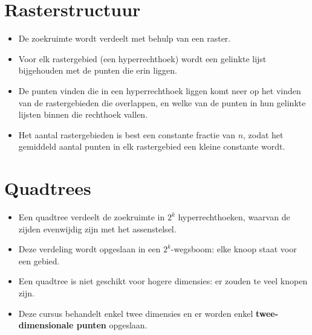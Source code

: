 \section{Rasterstructuur}
\begin{itemize}
    \item De zoekruimte wordt verdeelt met behulp van een raster.
    \item Voor elk rastergebied (een hyperrechthoek) wordt een gelinkte lijst bijgehouden met de punten die erin liggen.
    \item De punten vinden die in een hyperrechthoek liggen komt neer op het vinden van de rastergebieden die overlappen, en welke van de punten in hun gelinkte lijsten binnen die rechthoek vallen.
    \item Het aantal rastergebieden is best een constante fractie van $n$, zodat het gemiddeld aantal punten in elk rastergebied een kleine constante wordt.
\end{itemize}
\section{Quadtrees}
\begin{itemize}
    \item Een quadtree verdeelt de zoekruimte in $2^k$ hyperrechthoeken, waarvan de zijden evenwijdig zijn met het assenstelsel.
    \item Deze verdeling wordt opgeslaan in een $2^k$-wegsboom: elke knoop staat voor een gebied.
    \item Een quadtree is niet geschikt voor hogere dimensies: er zouden te veel knopen zijn.
    \item Deze cursus behandelt enkel twee dimensies en er worden enkel \textbf{twee-dimensionale punten} opgeslaan.
\end{itemize}

